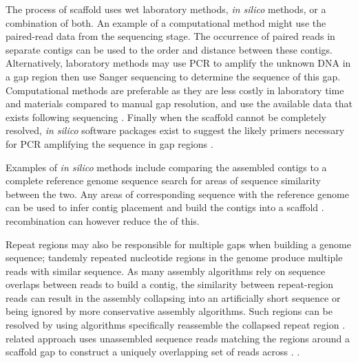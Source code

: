\documentclass[10pt]{bmc_article}
\newenvironment{bmcformat}{\begin{raggedright}\baselineskip20pt\sloppy\setboolean{publ}{false}}{\end{raggedright}\baselineskip20pt\sloppy}
\begin{document}
\begin{bmcformat}
The process of  scaffold  uses wet laboratory methods, \emph{in silico}
methods, or a combination of both. An example of a computational method might
use the  paired-read data from the sequencing stage.
 The occurrence of paired reads in separate contigs can be used to
 the order and
distance between these contigs. Alternatively, laboratory methods may use PCR
to amplify the unknown DNA in a gap region then use 
Sanger sequencing to determine the sequence of this gap. Computational methods
are  preferable as they are less costly in laboratory time and
materials compared to manual gap resolution, and use the available data that
exists following sequencing \cite{nagarajan2010}. Finally when the scaffold
cannot be completely resolved, \emph{in silico} software packages exist to
suggest the likely primers necessary for PCR amplifying the sequence in gap
regions \cite{gordon2001}. \pb

Examples of \emph{in silico} methods include 
comparing the assembled contigs to a complete reference genome sequence
 search for areas of sequence similarity between the
two. Any areas of corresponding sequence with the reference genome can be used
to infer contig placement and build the contigs into a scaffold
\cite{richter2007,zhao2008,assefa2009}.  recombination
 can however reduce the
 of this. \pb

Repeat regions may also be responsible for multiple gaps when building
a genome sequence; tandemly repeated nucleotide regions in the genome produce
multiple reads with similar sequence. As many assembly algorithms rely on
sequence overlaps between reads to build a contig, the similarity between
repeat-region reads can result in the assembly collapsing into an artificially
short sequence or being ignored by more conservative assembly algorithms. Such
regions can be resolved by using algorithms  specifically reassemble
the collapsed repeat region  \cite{mulyukov2002,koren2010}.
 related approach uses unassembled sequence reads matching
the regions around a scaffold gap to construct a uniquely overlapping set of
reads across . \cite{tsai2010}. \pb


\end{bmcformat}
\end{document}
